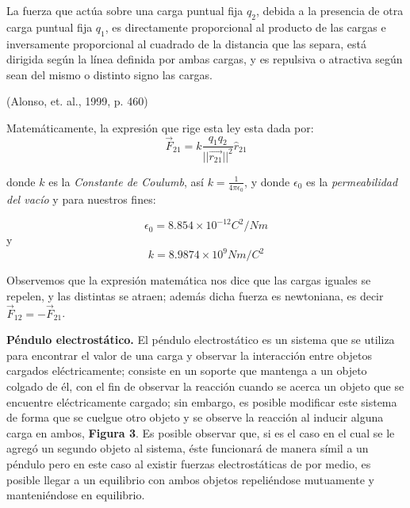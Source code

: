 \documentclass[letterpaper, 11 pt]{article}
\begin{document}
\begin{multicols*}{2}
\begin{center}
    \begin{minipage}{0.9\linewidth}
        \vspace{5pt}%
        {\small
             La fuerza que actúa sobre una carga puntual fija $q_2$, debida a la presencia de otra carga puntual fija $q_1$, es directamente proporcional al producto de las cargas e inversamente proporcional al cuadrado de la distancia que las separa, está dirigida según la línea definida por ambas cargas, y es repulsiva o atractiva según sean del mismo o distinto signo las cargas.
        }
        \begin{flushright}
            (Alonso, et. al., 1999, p. 460)
        \end{flushright}
        \vspace{5pt}%
    \end{minipage}
\end{center}

Matemáticamente, la expresión que rige esta ley esta dada por:
\begin{equation}
   \Vec{F}_{21}=k\frac{q_1q_2}{||\Vec{r_{21}}||^2}\hat{r}_{21}
   \end{equation}
 
 donde $k$ es la \textit{Constante de Coulumb}, así $k= \frac{1}{4 \pi \epsilon_{0}}$, y donde $\epsilon_{0}$ es la \textit{permeabilidad del vacío} y para nuestros fines:

$$\epsilon_{0}= 8.854\times 10^{-12} C^2/ Nm$$
y
$$k=8.9874 \times 10^{9} Nm/ C^2$$

Observemos que la expresión matemática nos dice que las cargas iguales se repelen, y las distintas se atraen; además dicha fuerza es newtoniana, es decir $\vec{F}_{12} = -\vec{F}_{21}$.



   
\textbf{Péndulo electrostático.} El péndulo electrostático es un sistema que se utiliza para encontrar 
el valor  de una carga y observar la interacción entre objetos cargados eléctricamente; consiste en un soporte que mantenga a un objeto colgado de él, con el fin de observar la reacción  cuando se acerca un objeto que se encuentre eléctricamente cargado; sin embargo, es posible modificar este sistema de forma que se cuelgue otro objeto y se observe la reacción al inducir alguna carga en ambos, \textbf{Figura 3}. Es posible observar que, si es el caso en el cual se le agregó un segundo objeto al sistema, éste funcionará de manera símil a un péndulo pero en este caso al existir fuerzas electrostáticas de por medio, es posible llegar a un equilibrio con ambos objetos repeliéndose mutuamente y manteniéndose en equilibrio. 


\end{multicols*}
\end{document}
